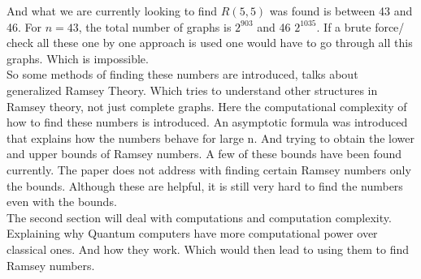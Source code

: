 \documentclass[15pt, a4paper]{Assignment}
\begin{document}
And what we are currently looking to find $R(5,5)$ was found is between 43 and 46\cite{angeltveit2024r55le46}.
For $n= 43$, the total number of graphs is $2^{903}$ and 46 $2^{1035}$.
If a brute force/ check all these one by one approach is used one would have to go through all this graphs.
Which is impossible.\\
So some methods of finding these numbers are introduced, \cite{burr1981generalized} talks about generalized Ramsey Theory.
Which tries to understand other structures in Ramsey theory, not just complete graphs.
Here the computational complexity of how to find these numbers is introduced.
An asymptotic formula was introduced that explains how the numbers behave for large n.
And trying to obtain the lower and upper bounds of Ramsey numbers.
A few of these bounds have been found currently.
The paper does not address with finding certain Ramsey numbers only the bounds.
Although these are helpful, it is still very hard to find the numbers even with the bounds.\\
The second section will deal with computations and computation complexity.
Explaining why Quantum computers have more computational power over classical ones.
And how they work.	
Which would then lead to using them to find Ramsey numbers.
\end{document}
